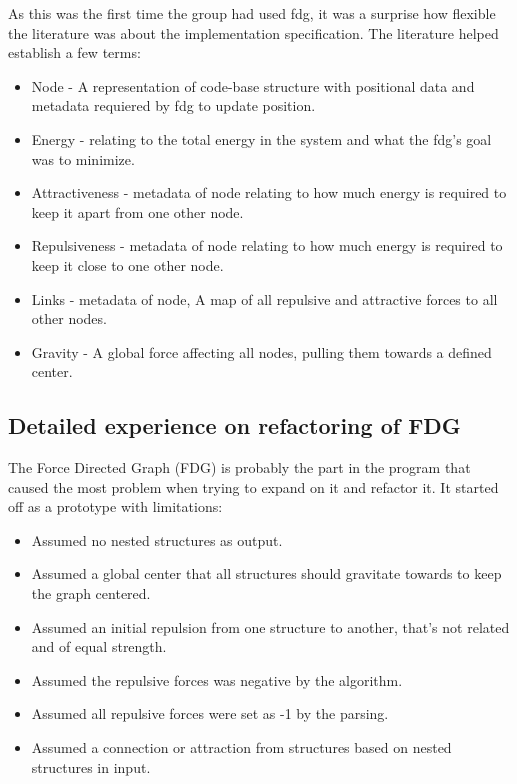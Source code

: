 As this was the first time the group had used \gls{fdg}, it was a surprise how flexible the literature was about the implementation specification. The literature helped establish a few terms:

\begin{itemize}
    \item Node - A representation of code-base structure with positional data and metadata requiered by \gls{fdg} to update position.
    \item Energy - relating to the total energy in the system and what the \gls{fdg}'s goal was to minimize.
    \item Attractiveness - metadata of node relating to how much energy is required to keep it apart from one other node.
    \item Repulsiveness - metadata of node relating to how much energy is required to keep it close to one other node.
    \item Links - metadata of node, A map of all repulsive and attractive forces to all other nodes.
    \item Gravity - A global force affecting all nodes, pulling them towards a defined center.
\end{itemize}

\subsection{Detailed experience on refactoring of FDG}
The Force Directed Graph (FDG) is probably the part in the program that caused the most problem when trying to expand on it and refactor it.
It started off as a prototype with limitations:
\begin{itemize}
    \item Assumed no nested structures as output.
    \item Assumed a global center that all structures should gravitate towards to keep the graph centered.
    \item Assumed an initial repulsion from one structure to another, that's not related and of equal strength.
    \item Assumed the repulsive forces was negative by the algorithm.
    \item Assumed all repulsive forces were set as -1 by the parsing.
    \item Assumed a connection or attraction from structures based on nested structures in input.
\end{itemize}

